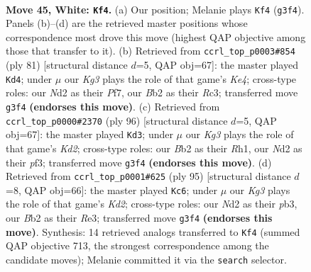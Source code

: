 \documentclass[11pt]{article}
\begin{document}
\clearpage

\begin{figure}[p]\centering
\begin{subfigure}{0.46\textwidth}\centering
\resizebox{\linewidth}{!}{%
\newchessgame
\chessboard[
  setfen={5k2/2P5/6r1/8/8/6K1/1B1N4/8 w - - 3 45},
  showmover=false,
  pgfstyle=straightmove, color=movearrow, markmove={g3-f4}
]}
\caption{}
\end{subfigure}\hfill
\begin{subfigure}{0.46\textwidth}\centering
\resizebox{\linewidth}{!}{%
\newchessgame
\chessboard[
  setfen={8/5p2/8/1R2k3/7P/2r5/5K2/8 b - - 1 41},
  showmover=false,
  pgfstyle=straightmove, color=movearrow, markmove={e5-d4}
]}
\caption{}
\end{subfigure}
\\[4pt]
\begin{subfigure}{0.46\textwidth}\centering
\resizebox{\linewidth}{!}{%
\newchessgame
\chessboard[
  setfen={8/8/8/6k1/1P6/5p2/r2K4/7R w - - 4 49},
  showmover=false,
  pgfstyle=straightmove, color=movearrow, markmove={d2-d3}
]}
\caption{}
\end{subfigure}\hfill
\begin{subfigure}{0.46\textwidth}\centering
\resizebox{\linewidth}{!}{%
\newchessgame
\chessboard[
  setfen={8/R2k3p/8/8/6K1/1P2r3/8/8 b - - 1 48},
  showmover=false,
  pgfstyle=straightmove, color=movearrow, markmove={d7-c6}
]}
\caption{}
\end{subfigure}
\caption{\textbf{Move 45, White: \texttt{Kf4}.} (a) Our position; Melanie plays \texttt{Kf4} (\texttt{g3f4}). Panels (b)--(d) are the retrieved master positions whose correspondence most drove this move (highest QAP objective among those that transfer to it). (b) Retrieved from \texttt{ccrl\_top\_p0003\#854} (ply 81) [structural distance $d$=5, QAP obj=67]: the master played \texttt{Kd4}; under $\mu$ our \emph{Kg3} plays the role of that game's \emph{Ke4}; cross-type roles: our \emph{N}d2 as their \emph{P}f7, our \emph{B}b2 as their \emph{R}c3; transferred move \texttt{g3f4} \textbf{(endorses this move)}. (c) Retrieved from \texttt{ccrl\_top\_p0000\#2370} (ply 96) [structural distance $d$=5, QAP obj=67]: the master played \texttt{Kd3}; under $\mu$ our \emph{Kg3} plays the role of that game's \emph{Kd2}; cross-type roles: our \emph{B}b2 as their \emph{R}h1, our \emph{N}d2 as their \emph{p}f3; transferred move \texttt{g3f4} \textbf{(endorses this move)}. (d) Retrieved from \texttt{ccrl\_top\_p0001\#625} (ply 95) [structural distance $d$=8, QAP obj=66]: the master played \texttt{Kc6}; under $\mu$ our \emph{Kg3} plays the role of that game's \emph{Kd2}; cross-type roles: our \emph{N}d2 as their \emph{p}b3, our \emph{B}b2 as their \emph{R}e3; transferred move \texttt{g3f4} \textbf{(endorses this move)}. Synthesis: 14 retrieved analogs transferred to \texttt{Kf4} (summed QAP objective 713, the strongest correspondence among the candidate moves); Melanie committed it via the \texttt{search} selector.}
\label{fig:thought-m88}
\end{figure}
\end{document}
